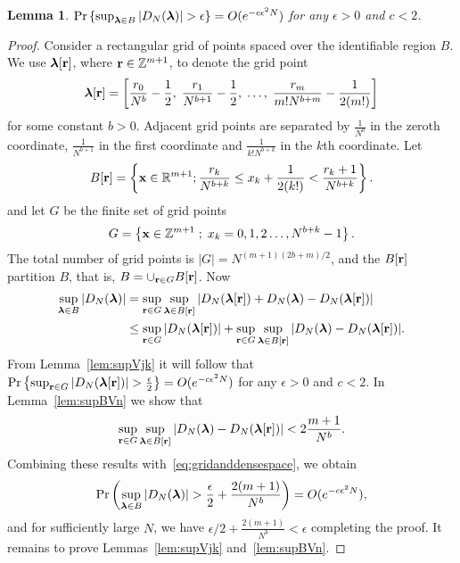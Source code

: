 \documentclass[aap]{imsart}
\newcommand{\reals}{{\mathbb R}}
\newcommand{\ints}{{\mathbb Z}}
\newcommand{\prob}{\operatorname{Pr}}
\renewcommand{\mid}{\; ; \;}
\newcommand{\abs}[1]{\left\vert #1 \right\vert}
\newcommand{\sabs}[1]{\vert #1 \vert}
\newtheorem{lemma}{Lemma}
\begin{document}
\begin{lemma} \label{lem:vn} $\prob \left\{ \sup_{\lambdabf \in B}\abs{ D_N(\lambdabf) } > \epsilon \right\} = O(e^{-c \epsilon^2 N})$ for any $\epsilon > 0$ and $c < 2$.
 \end{lemma}
\begin{proof}
Consider a rectangular grid of points spaced over the identifiable region $B$.  We use $\boldsymbol{\lambda}[\mathbf{r}]$, where $\rbf \in \ints^{m+1}$, to denote the grid point 
\[ 
 \boldsymbol{\lambda}[\mathbf{r}] = \left[  \frac{r_0}{N^{b}} - \frac{1}{2}, \; \frac{r_1}{N^{b+1}} - \frac{1}{2}, \; \dots, \; \frac{r_m}{m!N^{b+m}} - \frac{1}{2(m!) }\right]
\]
 for some constant $b>0$.  Adjacent grid points are separated by $\tfrac{1}{N^b}$ in the zeroth coordinate, $\tfrac{1}{N^{b+1}}$ in the first coordinate and $\tfrac{1}{k!N^{b+k}}$ in the $k$th coordinate. Let
 \[
 B[\rbf]=\left\{  \xbf\in\reals^{m+1}  ; \frac{r_k}{N^{b+k}}\leq x_k + \frac{1}{2(k!)} < \frac{r_k + 1}{N^{b+k}} \right\}  .
 \]
and let $G$ be the finite set of grid points
\[
G = \left\{ \xbf \in \ints^{m+1} \mid x_k = 0,1,2\dots,N^{b+k}-1  \right\}.
\]
The total number of grid points is $|G| = N^{(m+1)(2b + m)/2}$, and the $B[\mathbf{r}]$ partition $B$, that is, $B = \cup_{\mathbf{r} \in G}B[\mathbf{r}]$.  Now 
\begin{align}
 \sup_{\lambdabf \in B}\sabs{ D_N(\lambdabf) }  &= \sup_{\rbf \in G}\sup_{ \lambdabf \in B[\rbf]}\sabs{ D_N(\lambdabf[\rbf]) + D_N(\lambdabf) - D_N(\lambdabf[\rbf])  } \nonumber \\
 &\leq \sup_{\rbf \in G}\sabs{ D_N(\lambdabf[\rbf])} + \sup_{\rbf \in G}\sup_{\lambdabf\in B[\rbf]}\sabs{ D_N(\lambdabf) - D_N(\lambdabf[\rbf])  }. \label{eq:gridanddensespace}
 \end{align}
From Lemma~\ref{lem:supVjk} it will follow that $\prob\left\{   \sup_{\rbf \in G }\abs{ D_N(\lambdabf[\rbf])  } > \frac{\epsilon}{2} \right\} = O(e^{-c \epsilon^2 N})$
for any $\epsilon > 0$ and $c < 2$.  In Lemma~\ref{lem:supBVn} we show that
\[
\sup_{\rbf \in G}\sup_{\lambdabf\in B[\rbf]}\abs{ D_N(\lambdabf) - D_N(\lambdabf[\rbf])} < 2\frac{m+1}{N^b}.
\]
Combining these results with~\eqref{eq:gridanddensespace}, we obtain
\[
\prob\left(\sup_{\lambdabf \in B }\sabs{ D_N(\lambdabf)} > \frac{\epsilon}{2} +  \frac{2(m+1)}{N^b} \right) = O(e^{-c \epsilon^2 N}),
\]
and for sufficiently large $N$, we have $\epsilon/2 + \frac{2(m+1)}{N^b} < \epsilon$ completing the proof.  It remains to prove Lemmas~\ref{lem:supVjk} and~\ref{lem:supBVn}.
\end{proof}
\end{document}
